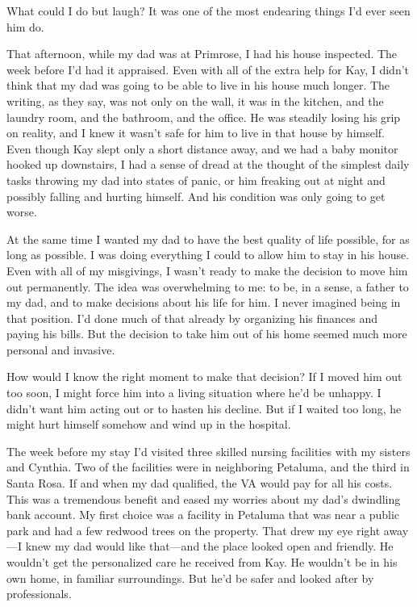 \documentclass[12pt]{book}
\begin{document}
What could I do but laugh? It was one of the most endearing things I'd ever seen him do.

That afternoon, while my dad was at Primrose, I had his house inspected. The week before I'd had it appraised. Even with all of the extra help for Kay, I didn't think that my dad was going to be able to live in his house much longer. The writing, as they say, was not only on the wall, it was in the kitchen, and the laundry room, and the bathroom, and the office. He was steadily losing his grip on reality, and I knew it wasn't safe for him to live in that house by himself. Even though Kay slept only a short distance away, and we had a baby monitor hooked up downstairs, I had a sense of dread at the thought of the simplest daily tasks throwing my dad into states of panic, or him freaking out at night and possibly falling and hurting himself. And his condition was only going to get worse.

At the same time I wanted my dad to have the best quality of life possible, for as long as possible. I was doing everything I could to allow him to stay in his house. Even with all of my misgivings, I wasn't ready to make the decision to move him out permanently. The idea was overwhelming to me: to be, in a sense, a father to my dad, and to make decisions about his life for him. I never imagined being in that position. I'd done much of that already by organizing his finances and paying his bills. But the decision to take him out of his home seemed much more personal and invasive.

How would I know the right moment to make that decision? If I moved him out too soon, I might force him into a living situation where he'd be unhappy. I didn't want him acting out or to hasten his decline. But if I waited too long, he might hurt himself somehow and wind up in the hospital.

The week before my stay I'd visited three skilled nursing facilities with my sisters and Cynthia. Two of the facilities were in neighboring Petaluma, and the third in Santa Rosa. If and when my dad qualified, the VA would pay for all his costs. This was a tremendous benefit and eased my worries about my dad's dwindling bank account. My first choice was a facility in Petaluma that was near a public park and had a few redwood trees on the property. That drew my eye right away---I knew my dad would like that---and the place looked open and friendly. He wouldn't get the personalized care he received from Kay. He wouldn't be in his own home, in familiar surroundings. But he'd be safer and looked after by professionals.
\end{document}
